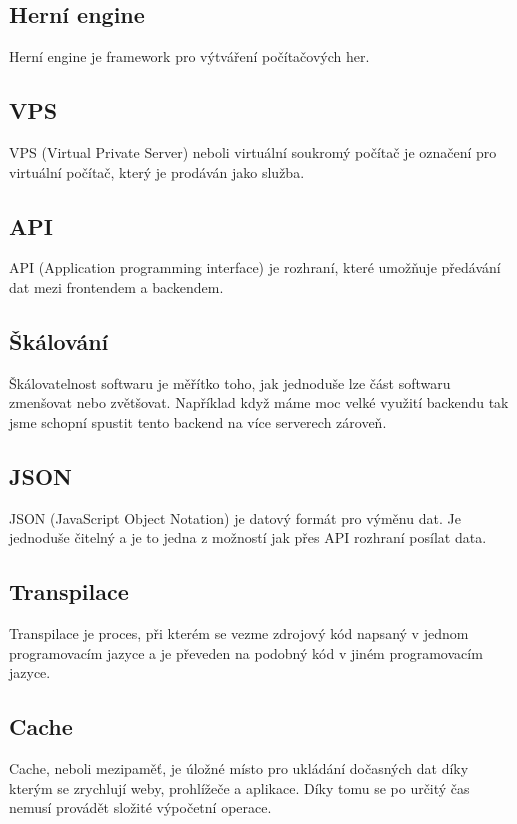 \subsection{Herní engine}
Herní engine je framework pro výtváření počítačových her.

\subsection{VPS}
VPS (Virtual Private Server) neboli virtuální soukromý počítač je označení pro virtuální počítač, který je prodáván jako služba.

\subsection{API}
API (Application programming interface) je rozhraní, které umožňuje předávání dat mezi frontendem a backendem.

\subsection{Škálování}
Škálovatelnost softwaru je měřítko toho, jak jednoduše lze část softwaru zmenšovat nebo zvětšovat. \cite{Skalovani} Například když máme moc velké využití backendu tak jsme schopní spustit tento backend na více serverech zároveň.

\subsection{JSON}
JSON (JavaScript Object Notation) je datový formát pro výměnu dat. Je jednoduše čitelný a je to jedna z možností jak přes API rozhraní posílat data. \cite{JSON}

\subsection{Transpilace}
Transpilace je proces, při kterém se vezme zdrojový kód napsaný v jednom programovacím jazyce a je převeden na podobný kód v jiném programovacím jazyce. \cite{Transpilace}

\subsection{Cache}
Cache, neboli mezipaměť, je úložné místo pro ukládání dočasných dat díky kterým se zrychlují weby, prohlížeče a aplikace. \cite{Cache} Díky tomu se po určitý čas nemusí provádět složité výpočetní operace.

